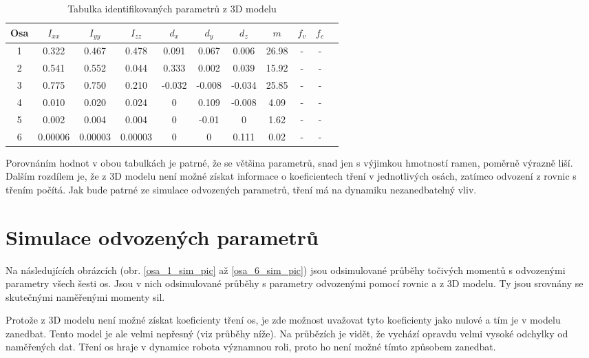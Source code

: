 \begin{table}[htbp]
  \centering
  \caption{Tabulka identifikovaných parametrů z 3D modelu}
    \begin{tabular}{c|cccccccccc}
    \multicolumn{1}{c|}{Osa} & \multicolumn{1}{c}{$I_{xx}$} & \multicolumn{1}{c}{$I_{yy}$} & \multicolumn{1}{c}{$I_{zz}$} & \multicolumn{1}{c}{$d_x$} & \multicolumn{1}{c}{$d_y$} & \multicolumn{1}{c}{$d_z$} & \multicolumn{1}{c}{$m$} & \multicolumn{1}{c}{$f_v$} & \multicolumn{1}{c}{$f_c$} \\
    \hline
    1  & 0.322   & 0.467   & 0.478   & 0.091 & 0.067 & 0.006 & 26.98 & - & - \\
    2  & 0.541   & 0.552   & 0.044   & 0.333 & 0.002 & 0.039 & 15.92 & - & - \\
    3  & 0.775   & 0.750   & 0.210   &-0.032 &-0.008 &-0.034 & 25.85 & - & - \\
    4  & 0.010   & 0.020   & 0.024   & 0     & 0.109 &-0.008 & 4.09  & - & - \\
    5  & 0.002   & 0.004   & 0.004   & 0     &-0.01  & 0     & 1.62  & - & - \\
    6  & 0.00006 & 0.00003 & 0.00003 & 0     & 0     & 0.111 & 0.02  & - & - \\
    \end{tabular}%
  \label{tab_ind_hodnot_3d}%
\end{table}%

Porovnáním hodnot v obou tabulkách je patrné, že se většina parametrů, snad jen s výjimkou hmotností ramen, poměrně výrazně liší. Dalším rozdílem je, že z 3D modelu není možné získat informace o koeficientech tření v jednotlivých osách, zatímco odvození z rovnic s třením počítá. Jak bude patrné ze simulace odvozených parametrů, tření má na dynamiku nezanedbatelný vliv.

\section{Simulace odvozených parametrů}

Na následujících obrázcích (obr. \ref{osa_1_sim_pic} až \ref{osa_6_sim_pic}) jsou odsimulované průběhy točivých momentů s odvozenými parametry všech šesti os. Jsou v nich odsimulované průběhy s parametry odvozenými pomocí rovnic a z 3D modelu. Ty jsou srovnány se skutečnými naměřenými momenty sil. 

Protože z 3D modelu není možné získat koeficienty tření os, je zde možnost uvažovat tyto koeficienty jako nulové a tím je v modelu zanedbat. Tento model je ale velmi nepřesný (viz průběhy níže). Na průbězích je vidět, že vychází opravdu velmi vysoké odchylky od naměřených dat. Tření os hraje v dynamice robota významnou roli, proto ho není možné tímto způsobem zanedbat.

